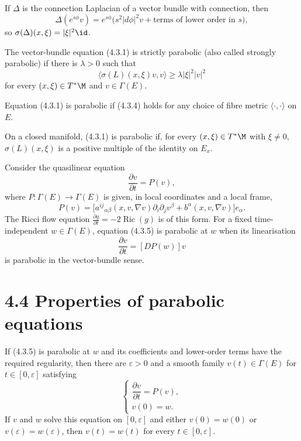 If $\Delta$ is the connection Laplacian of a vector bundle with connection,
then
\[
\Delta(e^{s\phi}v)
 =e^{s\phi}\bigl(s^2\lvert d\phi\rvert^2v+\text{terms of lower order in }s\bigr),
\]
so $\sigma(\Delta)(x,\xi)=\lvert\xi\rvert^2\id$.

The vector-bundle equation (4.3.1) is strictly parabolic (also called strongly
parabolic) if there is $\lambda>0$ such that
\[
\langle\sigma(L)(x,\xi)v,v\rangle
 \geq\lambda\lvert\xi\rvert^2\lvert v\rvert^2
\tag{4.3.4}
\]
for every $(x,\xi)\in T^*\M$ and $v\in\Gamma(E)$.

\begin{remark}
\label{topping-pde-vector-parabolic-fibre-metric}

Equation (4.3.1) is parabolic if (4.3.4) holds for any choice of fibre metric
$\langle\cdot,\cdot\rangle$ on $E$.
\end{remark}

\begin{remark}
\label{topping-pde-vector-parabolic-positive-multiple}

On a closed manifold, (4.3.1) is parabolic if, for every
$(x,\xi)\in T^*\M$ with $\xi\neq0$, $\sigma(L)(x,\xi)$ is a positive multiple
of the identity on $E_x$.
\end{remark}

Consider the quasilinear equation
\[
\frac{\partial v}{\partial t}=P(v),
\tag{4.3.5}
\]
where $P:\Gamma(E)\to\Gamma(E)$ is given, in local coordinates and a local frame,
\[
P(v)=\bigl[a^{ij}{}_{\alpha\beta}(x,v,\nabla v)\partial_i\partial_jv^\beta
 +b^\alpha(x,v,\nabla v)\bigr]e_\alpha.
\]
The Ricci flow equation $\frac{\partial g}{\partial t}=-2\operatorname{Ric}(g)$
is of this form. For a fixed time-independent $w\in\Gamma(E)$, equation
(4.3.5) is parabolic at $w$ when its linearisation
\[
\frac{\partial v}{\partial t}=[DP(w)]v
\]
is parabolic in the vector-bundle sense.

\section*{4.4 \quad Properties of parabolic equations}

If (4.3.5) is parabolic at $w$ and its coefficients and lower-order terms have
the required regularity, then there are $\varepsilon>0$ and a smooth family
$v(t)\in\Gamma(E)$ for $t\in[0,\varepsilon]$ satisfying
\[
\begin{cases}
\dfrac{\partial v}{\partial t}=P(v),\\
v(0)=w.
\end{cases}
\]
If $v$ and $w$ solve this equation on $[0,\varepsilon]$ and either
$v(0)=w(0)$ or $v(\varepsilon)=w(\varepsilon)$, then
$v(t)=w(t)$ for every $t\in[0,\varepsilon]$.
